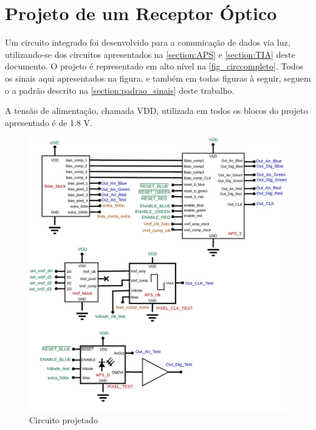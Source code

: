 \section[Projeto de um Receptor Óptico]{Projeto de um Receptor Óptico}
\label{sec_circ_comp}

Um circuito integrado foi desenvolvido para a comunicação de dados via luz, utilizando-se dos circuitos apresentados na \autoref{section:APS} e \autoref{section:TIA} deste documento. O projeto \'e representado em alto n\'ivel na \autoref{fig_circcompleto}. Todos os sinais aqui apresentados na figura, e tamb\'em em todas figuras \`a seguir, seguem o a padr\~ao descrito na \autoref{section:padrao_sinais} deste trabalho.

A tensão de alimentação, chamada VDD, utilizada em todos os blocos do projeto apresentado é de 1.8 V.

\begin{figure}[htb]
	\caption{\label{fig_circcompleto}Circuito projetado}
	\begin{center}
	    \includegraphics[width=\textwidth]{Circuitos/Complete_Circuit.png}
	\end{center}
\end{figure}

